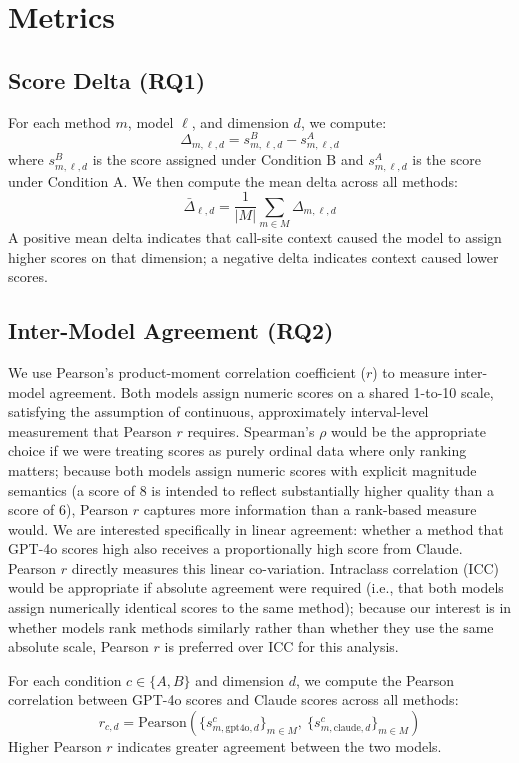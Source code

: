 \documentclass[12pt]{report}
\begin{document}
\section{Metrics}

\subsection{Score Delta (RQ1)}

For each method $m$, model $\ell$, and dimension $d$, we compute:
\[
\Delta_{m,\ell,d} = s^B_{m,\ell,d} - s^A_{m,\ell,d}
\]
where $s^B_{m,\ell,d}$ is the score assigned under Condition B and $s^A_{m,\ell,d}$ is the score under Condition A. We then compute the mean delta across all methods:
\[
\bar{\Delta}_{\ell,d} = \frac{1}{|M|} \sum_{m \in M} \Delta_{m,\ell,d}
\]
A positive mean delta indicates that call-site context caused the model to assign higher scores on that dimension; a negative delta indicates context caused lower scores.

\subsection{Inter-Model Agreement (RQ2)}

We use Pearson's product-moment correlation coefficient ($r$) to measure inter-model agreement. Both models assign numeric scores on a shared 1-to-10 scale, satisfying the assumption of continuous, approximately interval-level measurement that Pearson $r$ requires. Spearman's $\rho$ would be the appropriate choice if we were treating scores as purely ordinal data where only ranking matters; because both models assign numeric scores with explicit magnitude semantics (a score of 8 is intended to reflect substantially higher quality than a score of 6), Pearson $r$ captures more information than a rank-based measure would. We are interested specifically in linear agreement: whether a method that GPT-4o scores high also receives a proportionally high score from Claude. Pearson $r$ directly measures this linear co-variation. Intraclass correlation (ICC) would be appropriate if absolute agreement were required (i.e., that both models assign numerically identical scores to the same method); because our interest is in whether models rank methods similarly rather than whether they use the same absolute scale, Pearson $r$ is preferred over ICC for this analysis.

For each condition $c \in \{A, B\}$ and dimension $d$, we compute the Pearson correlation between GPT-4o scores and Claude scores across all methods:
\[
r_{c,d} = \text{Pearson}\left(\{s^c_{m,\text{gpt4o},d}\}_{m \in M},\ \{s^c_{m,\text{claude},d}\}_{m \in M}\right)
\]
Higher Pearson $r$ indicates greater agreement between the two models. 
\end{document}
